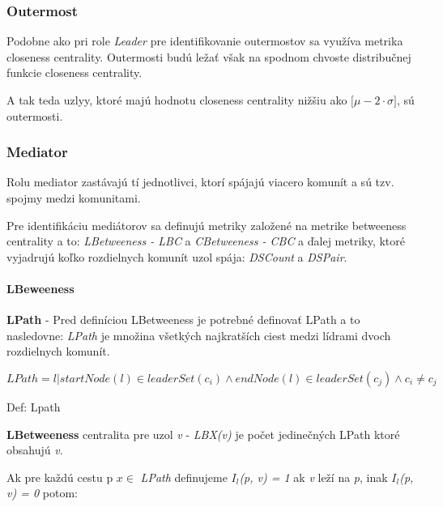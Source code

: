 \documentclass[slovak,master,public,dept460,male,cpdeclaration,oneside]{diploma}
\begin{document}
\subsubsection{Outermost}
Podobne ako pri role \textit{Leader} pre identifikovanie outermostov sa využíva metrika closeness centrality. Outermosti budú ležať však na spodnom chvoste distribučnej funkcie closeness centrality.

A tak teda uzlyy, ktoré majú hodnotu closeness centrality nižšiu ako ${\big[ \mu - 2\cdot\sigma \big]}$, sú outermosti.

\subsubsection{Mediator}
Rolu mediator zastávajú tí jednotlivci, ktorí spájajú viacero komunít a sú tzv. spojmy medzi komunitami. 


Pre identifikáciu mediátorov sa definujú metriky založené na metrike betweeness centrality a to:  \textit{LBetweeness - LBC} a \textit{CBetweeness - CBC} a ďalej metriky, ktoré vyjadrujú koľko rozdielnych komunít uzol spája: \textit{DSCount} a \textit{DSPair}.


\paragraph{LBeweeness}
\hfill \break
\textbf{LPath} - Pred definíciou LBetweeness je potrebné definovať LPath a to nasledovne: \textit{LPath} je množina všetkých najkratších ciest medzi lídrami dvoch rozdielnych komunít. 


\begin{mycapequ}[!ht]
   \begin{equation*}
     LPath = { l|startNode(l) \in  leaderSet(c_{i})\wedge endNode(l) \in leaderSet(c_{j}) \wedge c_{i}\neq c_{j} }
   \end{equation*}
   \caption{Def: Lpath}
\end{mycapequ}



{\setlength{\parindent}{0cm}
\begin{sloppypar}
\textbf{LBetweeness} centralita pre uzol \textit{v} - \textit{LBX(v)} je počet jedinečných LPath ktoré obsahujú \textit{v}. 


Ak pre každú cestu p  ${x \in}$ \textit{LPath} definujeme \textit{${I_l}$(p, v) = 1} ak \textit{v} leží na \textit{p}, inak \textit{${I_l}$(p, v) = 0} potom:
\end{sloppypar}
}
 
\end{document}
